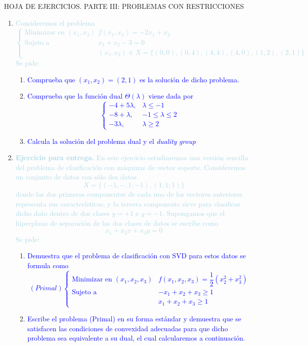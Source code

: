 \documentclass[a4paper]{article}
\newcommand{\lb}[1]{\textcolor{lightblue}{#1}}
\newcommand{\db}[1]{\textcolor{blue}{#1}}
\begin{document}
\begin{center}
    HOJA DE EJERCICIOS. PARTE III: PROBLEMAS CON RESTRICCIONES
\end{center}

\begin{enumerate}[label=\color{red}\arabic*.]
    \item \lb{Consideremos el problema \[ \begin{cases}
    \text{Minimizar en }(x_1,x_2) & f(x_1,x_2)=-2x_{1}+x_{2}\\
    \text{Sujeto a} & x_{1}+x_{2}-3=0\\
     & (x_{1},x_{2})\in X=\{(0,0),(0,4),(4,4),(4,0),(1,2),(2,1)\}
    \end{cases} \]Se pide:}
    \begin{enumerate}[label=\color{red}\alph*)]
    	\item \db{Comprueba que $(x_{1},x_{2})=(2,1)$ es la solución de dicho problema.}
    	
    	\item \db{Comprueba que la función dual $\Theta(\lambda)$ viene dada por \[ \begin{cases}
    	-4+5\lambda, & \lambda\le-1\\
    	-8+\lambda, & -1\le\lambda\le 2\\
    	-3\lambda, & \lambda\ge2
    	\end{cases} \]}
    	
    	\item \db{Calcula la solución del problema dual y el \textit{duality group}}
    \end{enumerate}
    \item \lb{\textbf{Ejercicio para entrega.} En este ejercicio estudiaremos una versión sencilla del problema de clasificación con máquinas de vector soporte. Consideremos un conjunto de datos con sólo dos datos \[ X=\{(-1,-,1;-1),(1,1;1)\} \]donde las dos primeras componentes de cada uno de los vectores anteriores representa sus características, y la tercera componente sirve para clasificar dicho dato dentro de dos clases $y=+1$ e $y=-1$. Supongamos que el hiperplano de separación de las dos clases de datos se escribe como \[ x_{1}+x_{2}x+x_{3}y=0 \]Se pide:}
    \begin{enumerate}[label=\color{red}\alph*)]
    	\item \db{Demuestra que el problema de clasificación con SVD para estos datos se formula como \[ (Primal)\begin{cases}
    	\text{Minimizar en }(x_{1},x_{2},x_{3}) & f(x_1,x_2,x_3)=\dfrac{1}{2}(x_2^2+x_3^2)\\
    	\text{Sujeto a } & -x_{1}+x_{2}+x_{3}\ge1 \\
    	 & x_1+x_2+x_3\ge1
    	\end{cases} \]}
    	\item \db{Escribe el problema (Primal) en su forma estándar y demuestra que se satisfacen las condiciones de convexidad adecuadas para que dicho problema sea equivalente a su dual, el cual calcularemos a continuación.}
    	

\end{enumerate}
\end{enumerate}
\end{document}

